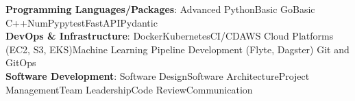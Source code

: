 \textbf{Programming Languages/Packages}: Advanced Python\inlinespace Basic Go\inlinespace Basic C++\inlinespace NumPy\inlinespace pytest\inlinespace FastAPI\inlinespace Pydantic \\[6pt]

\textbf{DevOps \& Infrastructure}: Docker\inlinespace Kubernetes\inlinespace CI/CD\inlinespace AWS Cloud Platforms (EC2, S3, EKS)\inlinespace Machine Learning Pipeline Development (Flyte, Dagster) \inlinespace Git and GitOps \\[6pt]

\textbf{Software Development}: Software Design\inlinespace Software Architecture\inlinespace Project Management\inlinespace Team Leadership\inlinespace Code Review\inlinespace Communication
